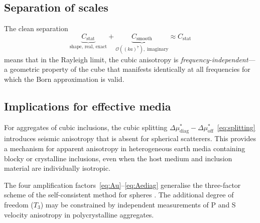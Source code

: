 \documentclass[11pt,a4paper]{article}
\newcommand{\order}[1]{\mathcal{O}\!\left(#1\right)}
\newcommand{\Dmu}{\Delta\mu}
\begin{document}
\subsection{Separation of scales}

The clean separation
\begin{equation*}
  \underbrace{C_\text{stat}}_{\text{shape, real, exact}}
  + \underbrace{C_\text{smooth}}_{\order{(ka)^7},\;\text{imaginary}}
  \approx C_\text{stat}
\end{equation*}
means that in the Rayleigh limit, the cubic anisotropy
is \emph{frequency-independent}---a geometric property of the
cube that manifests identically at all frequencies for which the
Born approximation is valid.

\subsection{Implications for effective media}

For aggregates of cubic inclusions, the cubic splitting
$\Dmu_\text{diag}^* - \Dmu_\text{off}^*$~\eqref{eq:splitting}
introduces seismic anisotropy that is absent for spherical
scatterers. This provides a mechanism for apparent anisotropy in
heterogeneous earth media containing blocky or crystalline
inclusions, even when the host medium and inclusion material
are individually isotropic.

The four amplification factors~\eqref{eq:Au}--\eqref{eq:Aediag}
generalise the three-factor scheme of the self-consistent method
for spheres \citep{Korringa1973,Willis1981}. The additional degree
of freedom ($T_3$) may be constrained by independent measurements
of P and S velocity anisotropy in polycrystalline aggregates.

\bigskip


\end{document}
